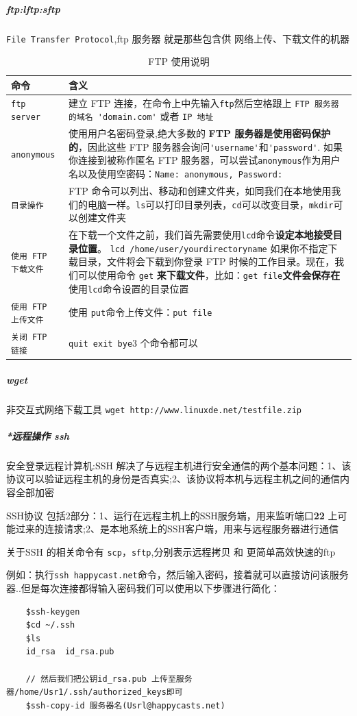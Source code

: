 \documentclass[UTF8,a4paper,12pt]{ctexbook}
\begin{document}
			\subparagraph{ftp:lftp:sftp} \verb|File Transfer Protocol|,ftp 服务器 就是那些包含供 网络上传、下载文件的机器
				\begin{table}[H]
					\centering
					\caption{FTP 使用说明}
					\begin{tabular}{l|m{13cm}}
						\hline
						命令 	   	   & 含义\\
						\hline
						\verb|ftp server|	&  建立 FTP 连接，在命令上中先输入\verb|ftp|然后空格跟上 \verb|FTP 服务器的域名 'domain.com'| 或者 \verb|IP 地址|\\
						\verb|anonymous|	 &  使用用户名密码登录,绝大多数的 \textbf{FTP 服务器是使用密码保护的}，因此这些 FTP 服务器会询问\verb|'username'|和\verb|'password'|.	如果你连接到被称作匿名 FTP 服务器，可以尝试\verb|anonymous|作为用户名以及使用空密码：\verb|Name: anonymous, Password:|\\
						\verb|目录操作|	 &  FTP 命令可以列出、移动和创建文件夹，如同我们在本地使用我们的电脑一样。\verb|ls|可以打印目录列表，\verb|cd|可以改变目录，\verb|mkdir|可以创建文件夹\\
						\verb|使用 FTP 下载文件|		&  在下载一个文件之前，我们首先需要使用\verb|lcd|命令\textbf{设定本地接受目录位置}。
						\verb|lcd /home/user/yourdirectoryname| 如果你不指定下载目录，文件将会下载到你登录 FTP 时候的工作目录。现在，我们可以使用命令 \verb|get| \textbf{来下载文件}，比如：\verb|get file|\textbf{文件会保存在}使用\verb|lcd|命令设置的目录位置\\
						\verb|使用 FTP 上传文件|	 &  使用 \verb|put|命令上传文件：\verb|put file|\\
						\verb|关闭 FTP 链接| &  \verb|quit exit bye|3 个命令都可以\\
						\hline
					\end{tabular}
				\end{table}	
				
			\subparagraph{wget} 非交互式网络下载工具 \verb|wget http://www.linuxde.net/testfile.zip|
			
			\subparagraph{*远程操作 ssh} 安全登录远程计算机:SSH 解决了与远程主机进行安全通信的两个基本问题：1、该协议可以验证远程主机的身份是否真实;2、该协议将本机与远程主机之间的通信内容全部加密
				
				SSH协议 包括2部分：1、运行在远程主机上的SSH服务端，用来监听端口\textbf{22} 上可能过来的连接请求;2、是本地系统上的SSH客户端，用来与远程服务器进行通信
				
			关于SSH 的相关命令有 \verb|scp|，\verb|sftp|,分别表示远程拷贝 和 更简单高效快速的ftp
			
			例如：执行\verb|ssh happycast.net|命令，然后输入密码，接着就可以直接访问该服务器..但是每次连接都得输入密码我们可以使用以下步骤进行简化：
				\begin{lstlisting}
	$ssh-keygen
	$cd ~/.ssh
	$ls
	id_rsa  id_rsa.pub
	
	// 然后我们把公钥id_rsa.pub 上传至服务器/home/Usr1/.ssh/authorized_keys即可
	$ssh-copy-id 服务器名(Usrl@happycasts.net)
				\end{lstlisting}
			
\end{document}
